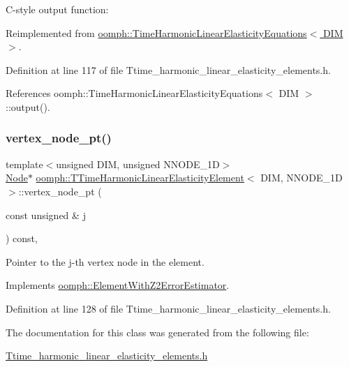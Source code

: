C-\/style output function\+: 



Reimplemented from \hyperlink{classoomph_1_1TimeHarmonicLinearElasticityEquations_a1913ef957b846a4bf04991718b83f9b5}{oomph\+::\+Time\+Harmonic\+Linear\+Elasticity\+Equations$<$ D\+I\+M $>$}.



Definition at line 117 of file Ttime\+\_\+harmonic\+\_\+linear\+\_\+elasticity\+\_\+elements.\+h.



References oomph\+::\+Time\+Harmonic\+Linear\+Elasticity\+Equations$<$ D\+I\+M $>$\+::output().

\mbox{\label{classoomph_1_1TTimeHarmonicLinearElasticityElement_a18f6af257eff39c097cc70e49b9832a8}} 
\subsubsection{\texorpdfstring{vertex\+\_\+node\+\_\+pt()}{vertex\_node\_pt()}}
{\footnotesize\ttfamily template$<$unsigned D\+IM, unsigned N\+N\+O\+D\+E\+\_\+1D$>$ \\
\hyperlink{classoomph_1_1Node}{Node}$\ast$ \hyperlink{classoomph_1_1TTimeHarmonicLinearElasticityElement}{oomph\+::\+T\+Time\+Harmonic\+Linear\+Elasticity\+Element}$<$ D\+IM, N\+N\+O\+D\+E\+\_\+1D $>$\+::vertex\+\_\+node\+\_\+pt (\begin{DoxyParamCaption}\item[{const unsigned \&}]{j }\end{DoxyParamCaption}) const\hspace{0.3cm}{\ttfamily [inline]}, {\ttfamily [virtual]}}



Pointer to the j-\/th vertex node in the element. 



Implements \hyperlink{classoomph_1_1ElementWithZ2ErrorEstimator_a0eedccc33519f852c5dc2055ddf2774b}{oomph\+::\+Element\+With\+Z2\+Error\+Estimator}.



Definition at line 128 of file Ttime\+\_\+harmonic\+\_\+linear\+\_\+elasticity\+\_\+elements.\+h.



The documentation for this class was generated from the following file\+:\begin{DoxyCompactItemize}
\item 
\hyperlink{Ttime__harmonic__linear__elasticity__elements_8h}{Ttime\+\_\+harmonic\+\_\+linear\+\_\+elasticity\+\_\+elements.\+h}\end{DoxyCompactItemize}
